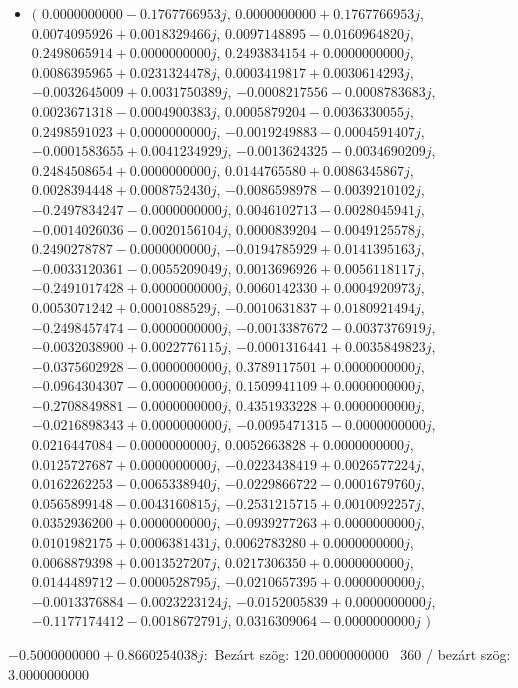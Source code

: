 \documentclass[14pt,a4paper]{article}
\begin{document}
\begin{itemize}
\item
$\big($
$0.0000000000-0.1767766953j$, $0.0000000000+0.1767766953j$, $0.0074095926+0.0018329466j$, $0.0097148895-0.0160964820j$, $0.2498065914+0.0000000000j$, $0.2493834154+0.0000000000j$, $0.0086395965+0.0231324478j$, $0.0003419817+0.0030614293j$, $-0.0032645009+0.0031750389j$, $-0.0008217556-0.0008783683j$, $0.0023671318-0.0004900383j$, $0.0005879204-0.0036330055j$, $0.2498591023+0.0000000000j$, $-0.0019249883-0.0004591407j$, $-0.0001583655+0.0041234929j$, $-0.0013624325-0.0034690209j$, $0.2484508654+0.0000000000j$, $0.0144765580+0.0086345867j$, $0.0028394448+0.0008752430j$, $-0.0086598978-0.0039210102j$, $-0.2497834247-0.0000000000j$, $0.0046102713-0.0028045941j$, $-0.0014026036-0.0020156104j$, $0.0000839204-0.0049125578j$, $0.2490278787-0.0000000000j$, $-0.0194785929+0.0141395163j$, $-0.0033120361-0.0055209049j$, $0.0013696926+0.0056118117j$, $-0.2491017428+0.0000000000j$, $0.0060142330+0.0004920973j$, $0.0053071242+0.0001088529j$, $-0.0010631837+0.0180921494j$, $-0.2498457474-0.0000000000j$, $-0.0013387672-0.0037376919j$, $-0.0032038900+0.0022776115j$, $-0.0001316441+0.0035849823j$, $-0.0375602928-0.0000000000j$, $0.3789117501+0.0000000000j$, $-0.0964304307-0.0000000000j$, $0.1509941109+0.0000000000j$, $-0.2708849881-0.0000000000j$, $0.4351933228+0.0000000000j$, $-0.0216898343+0.0000000000j$, $-0.0095471315-0.0000000000j$, $0.0216447084-0.0000000000j$, $0.0052663828+0.0000000000j$, $0.0125727687+0.0000000000j$, $-0.0223438419+0.0026577224j$, $0.0162262253-0.0065338940j$, $-0.0229866722-0.0001679760j$, $0.0565899148-0.0043160815j$, $-0.2531215715+0.0010092257j$, $0.0352936200+0.0000000000j$, $-0.0939277263+0.0000000000j$, $0.0101982175+0.0006381431j$, $0.0062783280+0.0000000000j$, $0.0068879398+0.0013527207j$, $0.0217306350+0.0000000000j$, $0.0144489712-0.0000528795j$, $-0.0210657395+0.0000000000j$, $-0.0013376884-0.0023223124j$, $-0.0152005839+0.0000000000j$, $-0.1177174412-0.0018672791j$, $0.0316309064-0.0000000000j$
$\big)$
\end{itemize}
$-0.5000000000+0.8660254038j$:\
Bezárt szög: $120.0000000000$ \
360 / bezárt szög: $3.0000000000$\
\end{document}
